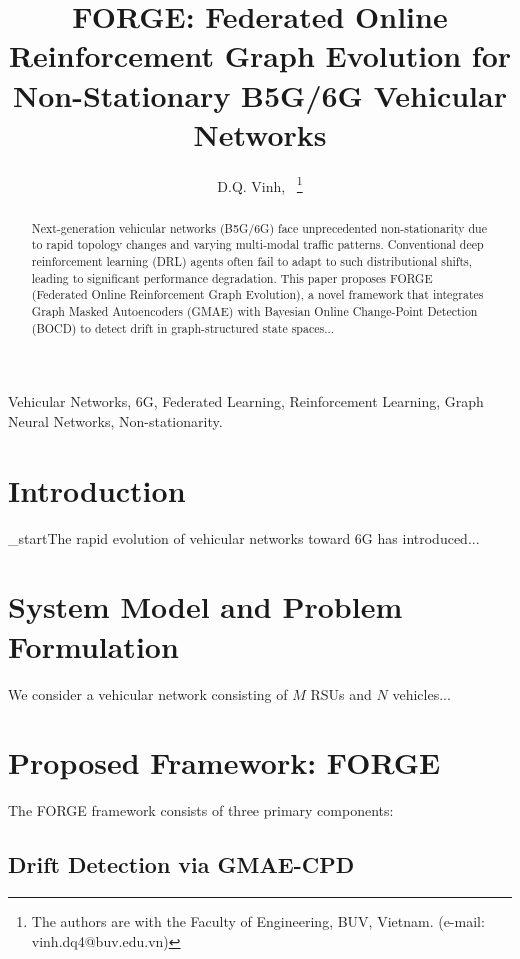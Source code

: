 \documentclass[journal]{IEEEtran}
\begin{document}
\title{FORGE: Federated Online Reinforcement Graph Evolution for Non-Stationary B5G/6G Vehicular Networks}

\author{D.Q. Vinh,~
\thanks{The authors are with the Faculty of Engineering, BUV, Vietnam. (e-mail: vinh.dq4@buv.edu.vn)}}

\maketitle

\begin{abstract}
Next-generation vehicular networks (B5G/6G) face unprecedented non-stationarity due to rapid topology changes and varying multi-modal traffic patterns. Conventional deep reinforcement learning (DRL) agents often fail to adapt to such distributional shifts, leading to significant performance degradation. This paper proposes FORGE (Federated Online Reinforcement Graph Evolution), a novel framework that integrates Graph Masked Autoencoders (GMAE) with Bayesian Online Change-Point Detection (BOCD) to detect drift in graph-structured state spaces...
\end{abstract}

\begin{IEEEkeywords}
Vehicular Networks, 6G, Federated Learning, Reinforcement Learning, Graph Neural Networks, Non-stationarity.
\end{IEEEkeywords}

\section{Introduction}
\IEEEPAR_start{T}{he} rapid evolution of vehicular networks toward 6G has introduced...

\section{System Model and Problem Formulation}
We consider a vehicular network consisting of $M$ RSUs and $N$ vehicles...

\section{Proposed Framework: FORGE}
The FORGE framework consists of three primary components:
\subsection{Drift Detection via GMAE-CPD}
\end{document}
